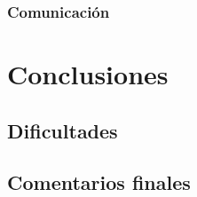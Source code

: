 \documentclass[a4paper]{article}
\begin{document}
			\subsubsection{Comunicación}\label{sec:ComuArd}
				\lipsum[1][10]
	\section{Conclusiones}\label{sec:Con}
		\subsection{Dificultades}\label{sec:Difi}
			\lipsum[1]
		\subsection{Comentarios finales}\label{sec:Cf}
			\lipsum[1]
			\cite{barrett2020arduinoI}
			\cite{barrett2020arduinoII}
			\cite{monk2011programmingI}
			\cite{barrett2020arduinoII}
		
	
	
\end{document}
